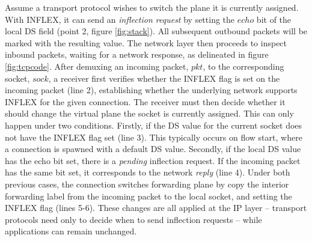 Assume a transport protocol wishes to switch the plane it is currently assigned.
With INFLEX, it can send an \emph{inflection request} by setting the $echo$ bit of the local \ac{DS} field (point 2, figure \ref{fig:stack}).
All subsequent outbound packets will be marked with the resulting value.
The network layer then proceeds to inspect inbound packets, waiting for a network response, as delineated in figure \ref{fig:tcpcode}.
After demuxing an incoming packet, $pkt$, to the corresponding socket, $sock$, a receiver first verifies whether the INFLEX flag is set on the incoming packet (line 2), establishing whether the underlying network supports INFLEX for the given connection.
The receiver must then decide whether it should change the virtual plane the socket is currently assigned.
This can only happen under two conditions.
Firstly, if the \ac{DS} value for the current socket does not have the INFLEX flag set (line 3).
This typically occurs on flow start, where a connection is spawned with a default \ac{DS} value.
Secondly, if the local \ac{DS} value has the echo bit set, there is a \emph{pending} inflection request.
If the incoming packet has the same bit set, it corresponds to the network \emph{reply} (line 4).
Under both previous cases, the connection switches forwarding plane by copy the interior forwarding label from the incoming packet to the local socket, and setting the INFLEX flag (lines 5-6).
These changes are all applied at the \ac{IP} layer -- transport protocols need only to decide when to send inflection requests -- while applications can remain unchanged.

